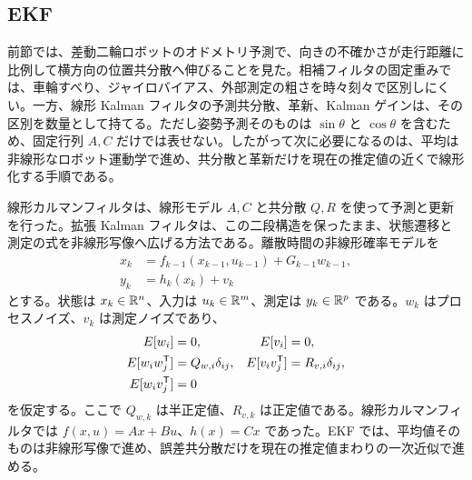 \subsection{EKF}

前節では、差動二輪ロボットのオドメトリ予測で、向きの不確かさが走行距離に比例して横方向の位置共分散へ伸びることを見た。相補フィルタの固定重みでは、車輪すべり、ジャイロバイアス、外部測定の粗さを時々刻々で区別しにくい。一方、線形 Kalman フィルタの予測共分散、革新、Kalman ゲインは、その区別を数量として持てる。ただし姿勢予測そのものは $\sin\theta$ と $\cos\theta$ を含むため、固定行列 $A,C$ だけでは表せない。したがって次に必要になるのは、平均は非線形なロボット運動学で進め、共分散と革新だけを現在の推定値の近くで線形化する手順である。

線形カルマンフィルタは、線形モデル $A,C$ と共分散 $Q,R$ を使って予測と更新を行った。拡張 Kalman フィルタは、この二段構造を保ったまま、状態遷移と測定の式を非線形写像へ広げる方法である。離散時間の非線形確率モデルを
\begin{align}
  x_k&=f_{k-1}(x_{k-1},u_{k-1})+G_{k-1}w_{k-1},\\
  y_k&=h_k(x_k)+v_k
\end{align}
とする。状態は $x_k\in\mathbb{R}^n$、入力は $u_k\in\mathbb{R}^m$、測定は $y_k\in\mathbb{R}^p$ である。$w_k$ はプロセスノイズ、$v_k$ は測定ノイズであり、
\begin{align}
  E[w_i]&=0,
  &E[v_i]&=0,\\
  E[w_iw_j^{\mathsf{T}}]&=Q_{w,i}\delta_{ij},
  &E[v_iv_j^{\mathsf{T}}]&=R_{v,i}\delta_{ij},\\
  E[w_iv_j^{\mathsf{T}}]&=0
\end{align}
を仮定する。ここで $Q_{w,k}$ は半正定値、$R_{v,k}$ は正定値である。線形カルマンフィルタでは $f(x,u)=Ax+Bu$、$h(x)=Cx$ であった。EKF では、平均値そのものは非線形写像で進め、誤差共分散だけを現在の推定値まわりの一次近似で進める。

